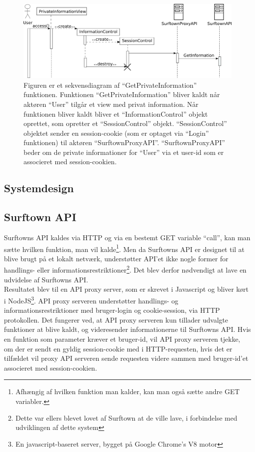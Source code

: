 \documentclass[12pt]{article}
\begin{document}
\begin{figure}
	\centering
	\includegraphics[width=13cm]{sekvens_diagrammer/GetPrivateInformation.png}
	\caption{Figuren er et sekvensdiagram af ``GetPrivateInformation'' funktionen. Funktionen ``GetPrivateInformation'' bliver kaldt når aktøren ``User'' tilgår et view med privat information. Når funktionen bliver kaldt bliver et ``InformationControl'' objekt oprettet, som opretter et ``SessionControl'' objekt. ``SessionControl'' objektet sender en session-cookie (som er optaget via ``Login'' funktionen) til aktøren ``SurftownProxyAPI''. ``SurftownProxyAPI'' beder om de private informationer for ``User'' via et user-id som er associeret med session-cookien.}
	\label{fig:GetPrivateInformation}
\end{figure}
\newpage
\subsection{Systemdesign}
\subsection*{Surftown API}
Surftowns API kaldes via HTTP og via en bestemt GET variable ``call'', kan man sætte hvilken funktion, man vil kalde\footnote{Afhængig af hvilken funktion man kalder, kan man også sætte andre GET variabler.}. 
Men da Surftowns API er designet til at blive brugt på et lokalt netværk, understøtter API'et ikke nogle former for handlings- eller informationsrestriktioner\footnote{Dette var ellers blevet lovet af Surftown at de ville lave, i forbindelse med udviklingen af dette system}. Det blev derfor nødvendigt at lave en udvidelse af Surftowns API.\\
Resultatet blev til en API proxy server, som er skrevet i Javascript og bliver kørt i NodeJS\footnote{En javascript-baseret server, bygget på Google Chrome's V8 motor}. API proxy serveren understøtter handlings- og informationsrestriktioner med bruger-login og cookie-session, via HTTP protokollen. Det fungerer ved, at API proxy serveren kun tillader udvalgte funktioner at blive kaldt, og videresender informationerne til Surftowns API. Hvis en funktion som parameter kræver et bruger-id, vil API proxy serveren tjekke, om der er sendt en gyldig session-cookie med i HTTP-requesten, hvis det er tilfældet vil proxy API serveren sende requesten videre sammen med bruger-id'et associeret med session-cookien.
\end{document}

